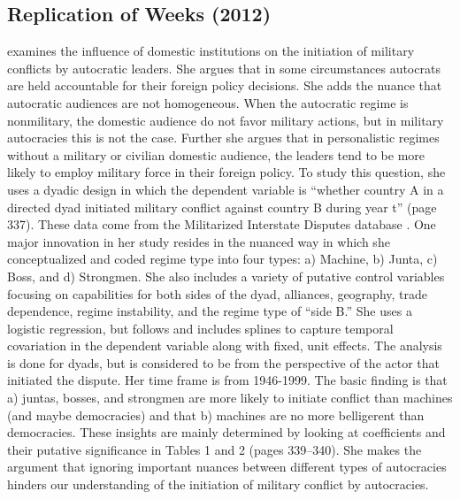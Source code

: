 \subsection{Replication of Weeks (2012)}

\citet{weeks:2012} examines the influence of domestic institutions on the initiation of military conflicts by autocratic leaders.  She argues that in some circumstances autocrats are held accountable for their foreign policy decisions. She adds the nuance that autocratic audiences are not homogeneous. When the autocratic regime is nonmilitary, the domestic audience do not favor military actions, but in military autocracies this is not the case. Further she argues that in personalistic regimes without a military or civilian domestic audience, the leaders tend to be more likely to employ military force in their foreign policy.  To study this question, she uses a dyadic design in which the dependent variable is ``whether country A in a directed dyad initiated military conflict against country B during year t'' (page 337).  These data come from the Militarized Interstate Disputes database \citep{maoz:2005}.  One major innovation in her study resides in the nuanced way in which she conceptualized and coded regime type into four types: a) Machine, b) Junta, c) Boss, and d) Strongmen. She also includes a variety of putative control variables focusing on capabilities for both sides of the dyad, alliances, geography, trade dependence, regime instability, and the regime type of ``side B.''  She uses a logistic regression, but follows \citet{beck:etal:1998} and includes splines to capture temporal covariation in the dependent variable along with  fixed, unit effects. The analysis is done for dyads, but is considered to be from the perspective of the actor that initiated the dispute. Her time frame is from 1946-1999.  The basic finding is that a) juntas, bosses, and strongmen are more likely to initiate conflict than machines (and maybe democracies) and that b) machines are no more belligerent than democracies.  These insights are mainly determined by looking at coefficients and their putative significance in Tables 1 and 2 (pages 339--340). She makes the argument that ignoring important nuances between different types of autocracies hinders our understanding of the initiation of military conflict by autocracies. 

